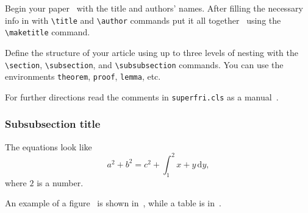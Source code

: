 \documentclass{superfri}
\begin{document}
Begin your paper~\cite{DBLP:series/cogtech/354089408} with the title and authors' names. After filling the
necessary info in with \verb=\title= and \verb=\author= commands put it all
together~\cite{SIV2008} using the \verb=\maketitle= command.

Define the structure of your article using up to three levels of nesting with
the \verb=\section=, \verb=\subsection=, and \verb=\subsubsection= commands.
You can use the environments \verb=theorem=, \verb=proof=, \verb=lemma=, etc.

For further directions read the comments in \verb=superfri.cls= as a manual~\cite{DBLP:journals/pcs/SokolinskyS16}.

\subsubsection{Subsubsection title}

The equations look like
\begin{equation}
a^2 + b^2 = c^2 + \int_1^2 x+y \, \mathrm{d}y,
\end{equation}
where $2$ is a number.

An example of a figure~\cite{DBLP:journals/corr/Zhang16b} is shown in~, while a table
is in~.



\openaccess
\end{document}
